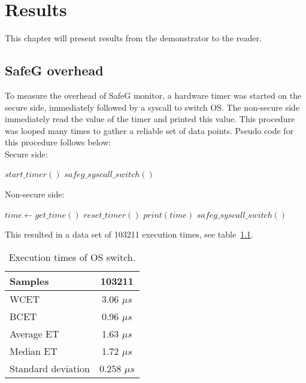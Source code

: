 \chapter{Results}
\label{sec:results}

This chapter will present results from the demonstrator to the reader.\\





\section{SafeG overhead}
To measure the overhead of SafeG monitor, a hardware timer was started on the secure side, immediately followed by a syscall to switch OS. The non-secure side immediately read the value of the timer and printed this value. This procedure was looped many times to gather a reliable set of data points. Pseudo code for this procedure follows below:\\

Secure side:
\begin{algorithmic}
\Loop
	\State $start\_timer()$
	\State $safeg\_syscall\_switch()$
\EndLoop
\end{algorithmic}

Non-secure side:
\begin{algorithmic}
\Loop
	\State $time\gets get\_time()$
	\State $reset\_timer()$
	\State $print(time)$
	\State $safeg\_syscall\_switch()$
\EndLoop
\end{algorithmic}


This resulted in a data set of 103211 execution times, see table~\ref{table:switch_et}.

\begin{table}[H]
\centering
\begin{tabular}{|l|c|}
\hline
Samples & 103211\\ \hline
WCET & 3.06 $\mu s$\\ \hline
BCET & 0.96 $\mu s$\\ \hline
Average ET & 1.63 $\mu s$\\ \hline
Median ET & 1.72 $\mu s$\\ \hline
Standard deviation & 0.258 $\mu s$\\ \hline
\end{tabular}
\caption{Execution times of OS switch.}
\label{table:switch_et}
\end{table}

